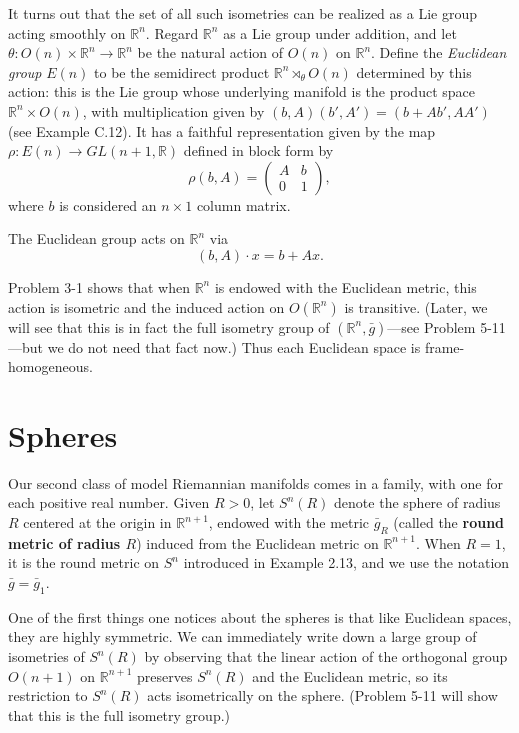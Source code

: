 It turns out that the set of all such isometries can be realized as a Lie group acting smoothly on $\mathbb{R}^n$. Regard $\mathbb{R}^n$ as a Lie group under addition, and let $\theta: O(n) \times \mathbb{R}^n \to \mathbb{R}^n$ be the natural action of $O(n)$ on $\mathbb{R}^n$. Define the \textit{Euclidean group} $E(n)$ to be the semidirect product $\mathbb{R}^n \rtimes_\theta O(n)$ determined by this action: this is the Lie group whose underlying manifold is the product space $\mathbb{R}^n \times O(n)$, with multiplication given by $(b, A)(b', A') = (b + Ab', AA')$ (see Example C.12). It has a faithful representation given by the map $\rho: E(n) \to GL(n+1, \mathbb{R})$ defined in block form by
\[
\rho(b, A) = \begin{pmatrix} A & b \\ 0 & 1 \end{pmatrix},
\]
where $b$ is considered an $n \times 1$ column matrix.

The Euclidean group acts on $\mathbb{R}^n$ via
\begin{equation}
(b, A) \cdot x = b + Ax. \tag{3.2}
\end{equation}

Problem 3-1 shows that when $\mathbb{R}^n$ is endowed with the Euclidean metric, this action is isometric and the induced action on $O(\mathbb{R}^n)$ is transitive. (Later, we will see that this is in fact the full isometry group of $(\mathbb{R}^n, \bar{g})$---see Problem 5-11---but we do not need that fact now.) Thus each Euclidean space is frame-homogeneous.

\section{Spheres}

Our second class of model Riemannian manifolds comes in a family, with one for each positive real number. Given $R > 0$, let $S^n(R)$ denote the sphere of radius $R$ centered at the origin in $\mathbb{R}^{n+1}$, endowed with the metric $\bar{g}_R$ (called the \textbf{round metric of radius $R$}) induced from the Euclidean metric on $\mathbb{R}^{n+1}$. When $R = 1$, it is the round metric on $S^n$ introduced in Example 2.13, and we use the notation $\bar{g} = \bar{g}_1$.

One of the first things one notices about the spheres is that like Euclidean spaces, they are highly symmetric. We can immediately write down a large group of isometries of $S^n(R)$ by observing that the linear action of the orthogonal group $O(n + 1)$ on $\mathbb{R}^{n+1}$ preserves $S^n(R)$ and the Euclidean metric, so its restriction to $S^n(R)$ acts isometrically on the sphere. (Problem 5-11 will show that this is the full isometry group.)

